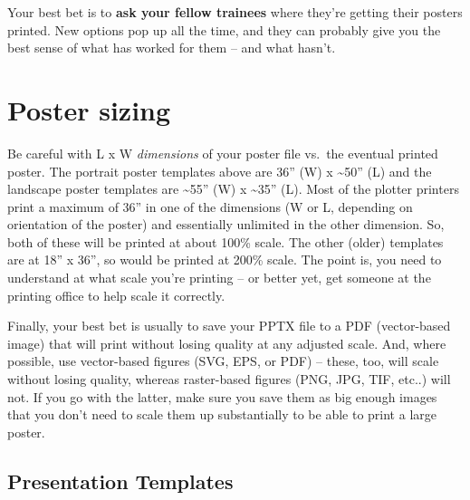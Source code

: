 \documentclass[
  letterpaper,
  DIV=11,
  numbers=noendperiod]{scrreprt}
\begin{document}
Your best bet is to \textbf{ask your fellow trainees} where they're
getting their posters printed. New options pop up all the time, and they
can probably give you the best sense of what has worked for them -- and
what hasn't.

\begin{tcolorbox}[enhanced jigsaw, colframe=quarto-callout-tip-color-frame, opacityback=0, leftrule=.75mm, bottomrule=.15mm, rightrule=.15mm, left=2mm, toptitle=1mm, colback=white, bottomtitle=1mm, titlerule=0mm, title=\textcolor{quarto-callout-tip-color}{\faLightbulb}\hspace{0.5em}{Tip}, arc=.35mm, toprule=.15mm, breakable, coltitle=black, colbacktitle=quarto-callout-tip-color!10!white, opacitybacktitle=0.6]


\hypertarget{poster-sizing}{%
\chapter{Poster sizing}\label{poster-sizing}}

Be careful with L x W \emph{dimensions} of your poster file vs.~the
eventual printed poster. The portrait poster templates above are 36''
(W) x \textasciitilde50'' (L) and the landscape poster templates are
\textasciitilde55'' (W) x \textasciitilde35'' (L). Most of the plotter
printers print a maximum of 36'' in one of the dimensions (W or L,
depending on orientation of the poster) and essentially unlimited in the
other dimension. So, both of these will be printed at about 100\% scale.
The other (older) templates are at 18'' x 36'', so would be printed at
200\% scale. The point is, you need to understand at what scale you're
printing -- or better yet, get someone at the printing office to help
scale it correctly.

Finally, your best bet is usually to save your PPTX file to a PDF
(vector-based image) that will print without losing quality at any
adjusted scale. And, where possible, use vector-based figures (SVG, EPS,
or PDF) -- these, too, will scale without losing quality, whereas
raster-based figures (PNG, JPG, TIF, etc..) will not. If you go with the
latter, make sure you save them as big enough images that you don't need
to scale them up substantially to be able to print a large poster.

\end{tcolorbox}

\hypertarget{presentation-templates}{%
\section{Presentation Templates}\label{presentation-templates}}
\end{document}
